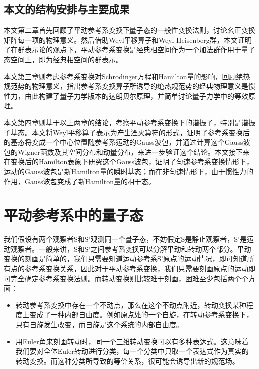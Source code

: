 \documentclass[a4paper]{article}
\begin{document}
    \subsection{本文的结构安排与主要成果}

        本文第二章首先回顾了平动参考系变换下量子态的一般性变换法则，讨论幺正变换矩阵每一项的物理意义。然后借助Weyl平移算子和Weyl-Heisenberg群，本文证明了在群表示论的观点下，平动参考系变换是经典相空间作为一个加法群作用于量子态空间上，即为经典相空间的群表示。

        本文第三章则考虑参考系变换对Schrodinger方程和Hamilton量的影响，回顾绝热规范势的物理意义，指出参考系变换算子所诱导的绝热规范势的经典物理意义是惯性力，由此构建了量子力学版本的达朗贝尔原理，并简单讨论量子力学中的等效原理。

        本文第四章则基于以上两章的结论，考察平动参考系变换下的谐振子，特别是谐振子基态。本文将Weyl平移算子表示为产生湮灭算符的形式，证明了参考系变换后的基态将变成一个中心位置随参考系运动的Gauss波包，并通过计算这个Gauss波包的Wigner函数及其空间分布和动量分布，来进一步验证这个结论。本文接下来在变换后的Hamilton表象下研究这个Gauss波包，证明了匀速参考系变换情形下，运动的Gauss波包是新Hamilton量的瞬时基态；而在非匀速情形下，由于惯性力的作用，Gauss波包变成了新Hamilton量的相干态。



    \section{平动参考系中的量子态}
        
        我们假设有两个观察者S和S'观测同一个量子态，不妨假定S是静止观察者，S'是运动观察者。一般来讲，S和S'之间参考系变换可以分解平动和转动两个部分。平动变换的刻画是简单的，我们只需要知道运动参考系S'原点的运动情况，即可知道所有点的参考系变换关系，因此对于平动参考系变换，我们只需要刻画原点的运动即可完全确定参考系变换法则。而转动变换则比较难于刻画，困难至少包括两个个方面：
        
        \begin{itemize}
            \item 转动参考系变换中存在一个不动点，那么在这个不动点附近，转动变换某种程度上变成了一种内部自由度。例如原点处的一个自旋，在转动参考系变换下，只有自旋发生改变，而自旋是这个系统的内部自由度。
            \item 用Euler角来刻画转动时，同一个三维转动变换可以有多种表达式。这意味着我们要对全体Euler转动进行分类，每一个分类中只取一个表达式作为真实的转动变换。而这种分类所导致的等价关系，很可能会诱导出新的规范场。
        \end{itemize}
        
\end{document}
